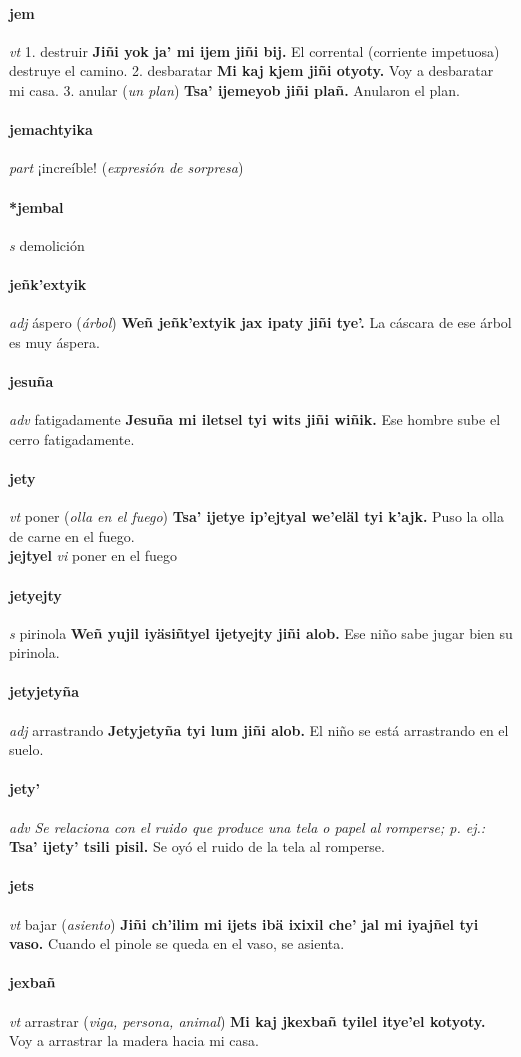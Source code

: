 \documentclass{scrbook}
\newcommand{\entry}[1]{\paragraph{#1}}
\newcommand{\onedefinition}[1]{#1.}
\newcommand{\nontranslationdef}[1]{\textit{#1}}
\newcommand{\partofspeech}[1]{\textit{#1}}
\newcommand{\spanishtranslation}[1]{#1}
\newcommand{\clarification}[1]{(\textit{#1})}
\newcommand{\cholexample}[1]{\textbf{#1}}
\newcommand{\exampletranslation}[1]{#1}
\newcommand{\secondaryentry}[1]{\\\textbf{#1}}
\newcommand{\secondpartofspeech}[1]{\textit{#1}}
\newcommand{\secondtranslation}[1]{#1}
\begin{document}
\begin{multicols}{2}
\entry{jem}
\partofspeech{vt}
\onedefinition{1}
\spanishtranslation{destruir}
\cholexample{Jiñi yok ja' mi ijem jiñi bij.}
\exampletranslation{El corrental (corriente impetuosa) destruye el camino.}
\onedefinition{2}
\spanishtranslation{desbaratar}
\cholexample{Mi kaj kjem jiñi otyoty.}
\exampletranslation{Voy a desbaratar mi casa.}
\onedefinition{3}
\spanishtranslation{anular}
\clarification{un plan}
\cholexample{Tsa' ijemeyob jiñi plañ.}
\exampletranslation{Anularon el plan.}

\entry{jemachtyika}
\partofspeech{part}
\spanishtranslation{¡increíble!}
\clarification{expresión de sorpresa}

\entry{*jembal}
\partofspeech{s}
\spanishtranslation{demolición}

\entry{jeñk'extyik}
\partofspeech{adj}
\spanishtranslation{áspero}
\clarification{árbol}
\cholexample{Weñ jeñk'extyik jax ipaty jiñi tye'.}
\exampletranslation{La cáscara de ese árbol es muy áspera.}

\entry{jesuña}
\partofspeech{adv}
\spanishtranslation{fatigadamente}
\cholexample{Jesuña mi iletsel tyi wits jiñi wiñik.}
\exampletranslation{Ese hombre sube el cerro fatigadamente.}

\entry{jety}
\partofspeech{vt}
\spanishtranslation{poner}
\clarification{olla en el fuego}
\cholexample{Tsa' ijetye ip'ejtyal we'eläl tyi k'ajk.}
\exampletranslation{Puso la olla de carne en el fuego.}
\secondaryentry{jejtyel}
\secondpartofspeech{vi}
\secondtranslation{poner en el fuego}

\entry{jetyejty}
\partofspeech{s}
\spanishtranslation{pirinola}
\cholexample{Weñ yujil iyäsiñtyel ijetyejty jiñi alob.}
\exampletranslation{Ese niño sabe jugar bien su pirinola.}

\entry{jetyjetyña}
\partofspeech{adj}
\spanishtranslation{arrastrando}
\cholexample{Jetyjetyña tyi lum jiñi alob.}
\exampletranslation{El niño se está arrastrando en el suelo.}

\entry{jety'}
\partofspeech{adv}
\nontranslationdef{Se relaciona con el ruido que produce una tela o papel al romperse; p. ej.:}
\cholexample{Tsa' ijety' tsili pisil.}
\exampletranslation{Se oyó el ruido de la tela al romperse.}

\entry{jets}
\partofspeech{vt}
\spanishtranslation{bajar}
\clarification{asiento}
\cholexample{Jiñi ch'ilim mi ijets ibä ixixil che' jal mi iyajñel tyi vaso.}
\exampletranslation{Cuando el pinole se queda en el vaso, se asienta.}

\entry{jexbañ}
\partofspeech{vt}
\spanishtranslation{arrastrar}
\clarification{viga, persona, animal}
\cholexample{Mi kaj jkexbañ tyilel itye'el kotyoty.}
\exampletranslation{Voy a arrastrar la madera hacia mi casa.}


\end{multicols}
\end{document}
